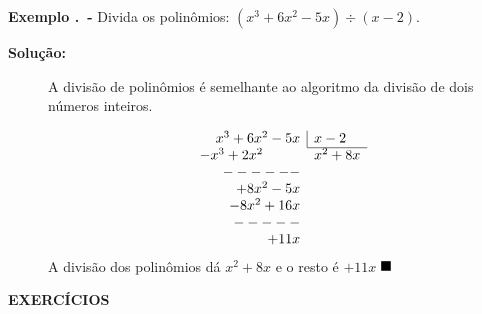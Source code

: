 \textbf{Exemplo \thesubsection.\theexemplo~-} Divida os polinômios: $(x^3 + 6x^2 - 5x) \div (x - 2)$.

\begin{description}
\item[\textbf{Solução:}]
A divisão de polinômios é semelhante ao algoritmo da divisão de dois números inteiros.

\[
\begin{array}{rl}
x^3 + 6x^2 - 5x & \myrule{x-2} \\
\cline{2-2}
-x^3 + 2x^2~~~~~~~~ & x^2  + 8x \\
------\\
+8x^2-5x\\
-8x^2+16x\\
-----\\
+11x
\end{array}
\]
A divisão dos polinômios dá $x^2  + 8x$ e o resto é $+11x$ $\qedsymbol$

\end{description}

\noindent\textbf{EXERCÍCIOS \thesubsection}

